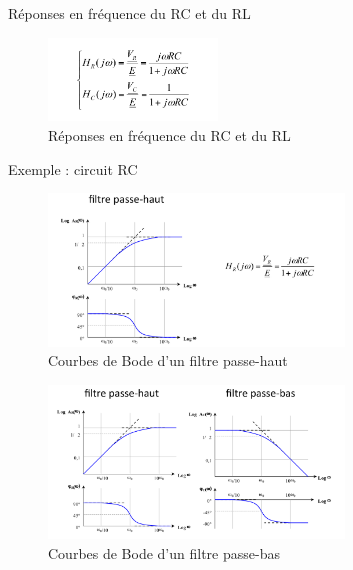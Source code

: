 \documentclass[a4paper]{article}
\begin{document}
            Réponses en fréquence du RC et du RL
            \begin{figure}[H]
                \begin{center}
                    \includegraphics[width=0.4\textwidth]{fig/2_reponse2.png}
                    \caption{Réponses en fréquence du RC et du RL}
                    \label{fig:2_superposition}
                \end{center}
            \end{figure}
            Exemple : circuit RC
            \begin{figure}[H]
                \begin{center}
                    \includegraphics[width=0.7\textwidth]{fig/2_reponse_RC1.png}
                    \caption{Courbes de Bode d'un filtre passe-haut}
                    \label{fig:2_superposition}
                \end{center}
            \end{figure}
            \begin{figure}[H]
                \begin{center}
                    \includegraphics[width=0.7\textwidth]{fig/2_reponse_RC2.png}
                    \caption{Courbes de Bode d'un filtre passe-bas}
                    \label{fig:2_superposition}
                \end{center}
            \end{figure}
\end{document}
